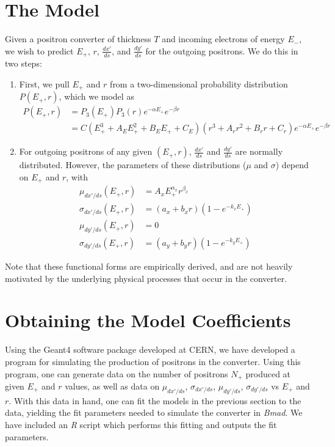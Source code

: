 \documentclass[12pt]{article}
\begin{document}
\newpage

\section*{The Model}

Given a positron converter of thickness $T$ and incoming electrons of energy $E_-$, we wish to predict $E_+$, $r$, $\frac{dx'}{ds}$, and $\frac{dy'}{ds}$ for the outgoing positrons.
We do this in two steps:
\begin{enumerate}
\item
First, we pull $E_+$ and $r$ from a two-dimensional probability distribution $P(E_+, r)$, which we model as
\begin{align*}
P(E_+, r) & = P_3(E_+) P_3(r) e^{-\alpha E_+} e^{-\beta r} \\
& = C(E_+^3 + A_E E_+^2 + B_E E_+ + C_E) (r^3 + A_r r^2 + B_r r + C_r) e^{-\alpha E_+} e^{-\beta r}
\end{align*}

\item
For outgoing positrons of any given $(E_+, r)$, $\frac{dx'}{ds}$ and $\frac{dy'}{ds}$ are normally distributed.
However, the parameters of these distributions ($\mu$ and $\sigma$) depend on $E_+$ and $r$, with
\begin{align*}
\mu_{dx'/ds}(E_+, r) & = A_x E_+^{\alpha_x} r^{\beta_x} \\
\sigma_{dx'/ds} (E_+, r) & = (a_x + b_x r) (1 - e^{-k_x E_+}) \\
\mu_{dy'/ds} (E_+, r) & = 0 \\
\sigma_{dy'/ds} (E_+, r) & = (a_y + b_y r) (1 - e^{-k_y E_+})
\end{align*}

\end{enumerate}

Note that these functional forms are empirically derived, and are not heavily motivated by the underlying physical processes that occur in the converter.


\section*{Obtaining the Model Coefficients}

Using the Geant4\cite{geant} software package developed at CERN, we have developed a program for simulating the production of positrons in the converter.
Using this program, one can generate data on the number of positrons $N_+$ produced at given $E_+$ and $r$ values, as well as data on $\mu_{dx'/ds}$, $\sigma_{dx'/ds}$, $\mu_{dy'/ds}$, $\sigma_{dy'/ds}$ vs $E_+$ and $r$.
With this data in hand, one can fit the models in the previous section to the data, yielding the fit parameters needed to simulate the converter in \textit{Bmad}.
We have included an \textit{R} script which performs this fitting and outputs the fit parameters.
\end{document}
